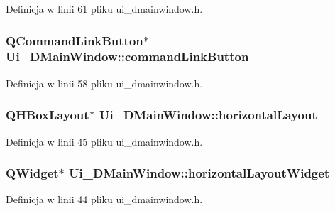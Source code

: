 Definicja w linii 61 pliku ui\+\_\+dmainwindow.\+h.

\hypertarget{class_ui___d_main_window_a0d790fbf37bac850b60a7cb42d100315}{}
\subsubsection[{command\+Link\+Button}]{\setlength{\rightskip}{0pt plus 5cm}Q\+Command\+Link\+Button$\ast$ Ui\+\_\+\+D\+Main\+Window\+::command\+Link\+Button}\label{class_ui___d_main_window_a0d790fbf37bac850b60a7cb42d100315}


Definicja w linii 58 pliku ui\+\_\+dmainwindow.\+h.

\hypertarget{class_ui___d_main_window_a4ab6ff85d8c5edef531b3f2111a04157}{}
\subsubsection[{horizontal\+Layout}]{\setlength{\rightskip}{0pt plus 5cm}Q\+H\+Box\+Layout$\ast$ Ui\+\_\+\+D\+Main\+Window\+::horizontal\+Layout}\label{class_ui___d_main_window_a4ab6ff85d8c5edef531b3f2111a04157}


Definicja w linii 45 pliku ui\+\_\+dmainwindow.\+h.

\hypertarget{class_ui___d_main_window_a777a56f3b74aa5b5cd5ff2c62a2968a9}{}
\subsubsection[{horizontal\+Layout\+Widget}]{\setlength{\rightskip}{0pt plus 5cm}Q\+Widget$\ast$ Ui\+\_\+\+D\+Main\+Window\+::horizontal\+Layout\+Widget}\label{class_ui___d_main_window_a777a56f3b74aa5b5cd5ff2c62a2968a9}


Definicja w linii 44 pliku ui\+\_\+dmainwindow.\+h.

\hypertarget{class_ui___d_main_window_aa528e417bc72cda19dfcea49f1617b2a}{}
